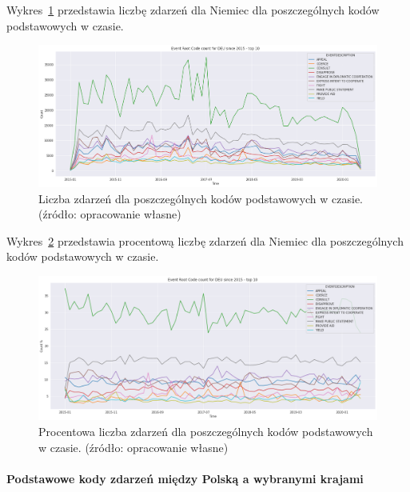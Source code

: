 \documentclass[11pt]{report}
\begin{document}
    Wykres~\ref{fig:DEUPERCinTIME} przedstawia liczbę zdarzeń dla Niemiec dla poszczególnych kodów podstawowych w czasie.
    \begin{figure}[!htp]
        \centering
        \includegraphics[width=\linewidth]{fig/DEU/DEUERCinTIME.png}
        \caption{Liczba zdarzeń dla poszczególnych kodów podstawowych w czasie. (źródło: opracowanie własne)}
        \label{fig:DEUPERCinTIME}
    \end{figure}

    Wykres~\ref{fig:DEUPERCpercinTIME} przedstawia procentową liczbę zdarzeń dla Niemiec dla poszczególnych kodów podstawowych w czasie.
    \begin{figure}[!htp]
        \centering
        \includegraphics[width=\linewidth]{fig/DEU/DEUERCpercinTIME.png}
        \caption{Procentowa liczba zdarzeń dla poszczególnych kodów podstawowych w czasie. (źródło: opracowanie własne)}
        \label{fig:DEUPERCpercinTIME}
    \end{figure}

    \paragraph{Podstawowe kody zdarzeń między Polską a wybranymi krajami}
\end{document}
